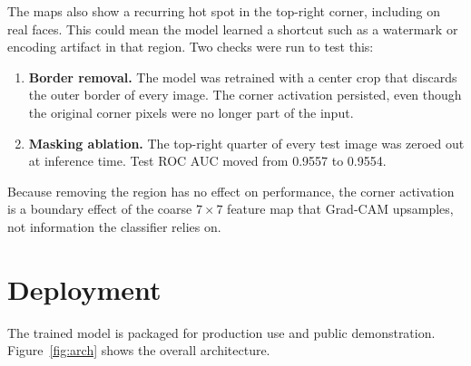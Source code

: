 \documentclass[11pt]{article}
\begin{document}
The maps also show a recurring hot spot in the top-right corner, including on real faces. This could mean the model learned a shortcut such as a watermark or encoding artifact in that region. Two checks were run to test this:
\begin{enumerate}
  \item \textbf{Border removal.} The model was retrained with a center crop that discards the outer border of every image. The corner activation persisted, even though the original corner pixels were no longer part of the input.
  \item \textbf{Masking ablation.} The top-right quarter of every test image was zeroed out at inference time. Test ROC AUC moved from 0.9557 to 0.9554.
\end{enumerate}
Because removing the region has no effect on performance, the corner activation is a boundary effect of the coarse $7\times7$ feature map that Grad-CAM upsamples, not information the classifier relies on.

\section{Deployment}

The trained model is packaged for production use and public demonstration. Figure~\ref{fig:arch} shows the overall architecture.
\end{document}
